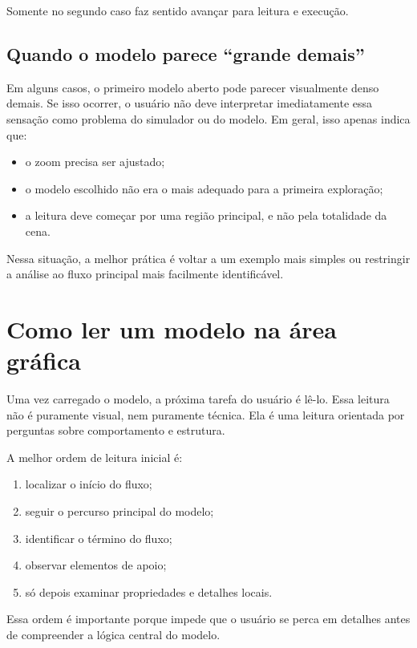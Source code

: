 Somente no segundo caso faz sentido avançar para leitura e execução.

\subsection{Quando o modelo parece ``grande demais''}
\label{subsec:cap4_modelo_grande_demais}

Em alguns casos, o primeiro modelo aberto pode parecer visualmente denso demais. Se isso ocorrer, o usuário não deve interpretar imediatamente essa sensação como problema do simulador ou do modelo. Em geral, isso apenas indica que:
\begin{itemize}
    \item o zoom precisa ser ajustado;
    \item o modelo escolhido não era o mais adequado para a primeira exploração;
    \item a leitura deve começar por uma região principal, e não pela totalidade da cena.
\end{itemize}

Nessa situação, a melhor prática é voltar a um exemplo mais simples ou restringir a análise ao fluxo principal mais facilmente identificável.

\section{Como ler um modelo na área gráfica}
\label{sec:cap4_como_ler_modelo_area_grafica}

Uma vez carregado o modelo, a próxima tarefa do usuário é lê-lo. Essa leitura não é puramente visual, nem puramente técnica. Ela é uma leitura orientada por perguntas sobre comportamento e estrutura.

A melhor ordem de leitura inicial é:
\begin{enumerate}
    \item localizar o início do fluxo;
    \item seguir o percurso principal do modelo;
    \item identificar o término do fluxo;
    \item observar elementos de apoio;
    \item só depois examinar propriedades e detalhes locais.
\end{enumerate}

Essa ordem é importante porque impede que o usuário se perca em detalhes antes de compreender a lógica central do modelo.

